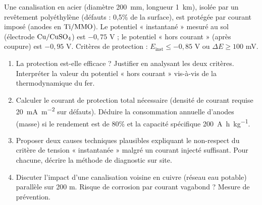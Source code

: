 \documentclass[11pt]{article}
\begin{document}
\begin{exercice}
Une canalisation en acier (diamètre \SI{200}{mm}, longueur \SI{1}{km}), isolée par un revêtement polyéthylène (défauts : 0,5\% de la surface), est protégée par courant imposé (anodes en $\ce{Ti/MMO}$). Le potentiel « instantané » mesuré au sol (électrode $\ce{Cu/CuSO4}$) est $-0,75$ V ; le potentiel « hors courant » (après coupure) est $-0,95$ V. Critères de protection : $E_{\text{inst}} \le -0,85$ V ou $\Delta E \ge 100$ mV.
\begin{enumerate}
    \item La protection est-elle efficace ? Justifier en analysant les deux critères. Interpréter la valeur du potentiel « hors courant » vis-à-vis de la thermodynamique du fer.
    \item Calculer le courant de protection total nécessaire (densité de courant requise \SI{20}{mA.m^{-2}} sur défauts). Déduire la consommation annuelle d'anodes (masse) si le rendement est de 80\% et la capacité spécifique \SI{200}{A.h.kg^{-1}}.
    \item Proposer deux causes techniques plausibles expliquant le non-respect du critère de tension « instantanée » malgré un courant injecté suffisant. Pour chacune, décrire la méthode de diagnostic sur site.
    \item Discuter l'impact d'une canalisation voisine en cuivre (réseau eau potable) parallèle sur 200 m. Risque de corrosion par courant vagabond ? Mesure de prévention.
\end{enumerate}
\end{exercice}
\end{document}
